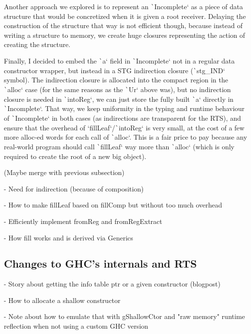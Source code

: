 \documentclass[english]{jflart}
\begin{document}
Another approach we explored is to represent an \texttt`Incomplete` as a piece of data structure that would be concretized when it is given a root receiver. Delaying the construction of the structure that way is not efficient though, because instead of writing a structure to memory, we create huge closures representing the action of creating the structure.

Finally, I decided to embed the \texttt`a` field in \texttt`Incomplete` not in a regular data constructor wrapper, but instead in a STG indirection closure (\texttt`stg_IND` symbol). The indirection closure is allocated into the compact region in the \texttt`alloc` case (for the same reasons as the \texttt`Ur` above was), but no indirection closure is needed in \texttt`intoReg`, we can just store the fully built \texttt`a` directly in \texttt`Incomplete`. That way, we keep uniformity in the typing and runtime behaviour of \texttt`Incomplete` in both cases (as indirections are transparent for the RTS), and ensure that the overhead of `fillLeaf`/\texttt`intoReg` is very small, at the cost of a few more alloc-ed words for each call of \texttt`alloc`. This is a fair price to pay because any real-world program should call \texttt`fillLeaf` way more than \texttt`alloc` (which is only required to create the root of a new big object).

(Maybe merge with previous subsection)

- Need for indirection (because of composition)

- How to make fillLeaf based on fillComp but without too much overhead

- Efficiently implement fromReg and fromRegExtract

- How fill works and is derived via Generics

\subsection{Changes to GHC's internals and RTS}

- Story about getting the info table ptr or a given constructor (blogpost)

- How to allocate a shallow constructor

- Note about how to emulate that with gShallowCtor and "raw memory" runtime reflection when not using a custom GHC version
\end{document}
